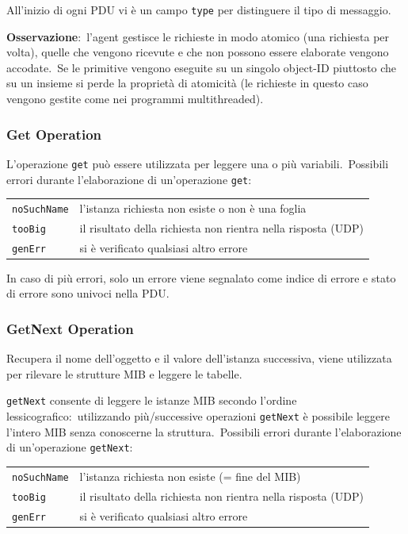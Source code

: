 All'inizio di ogni PDU vi è un campo \texttt{type} per distinguere il tipo di messaggio.\

\textbf{Osservazione}:\ l'agent gestisce le richieste in modo atomico (una richiesta per volta), quelle che vengono ricevute e che non possono essere elaborate vengono accodate.\
Se le primitive vengono eseguite su un singolo object-ID piuttosto che su un insieme si perde la proprietà di atomicità (le richieste in questo caso vengono gestite come nei programmi multithreaded).

\subsubsection{Get Operation}

L'operazione \texttt{get} può essere utilizzata per leggere una o più variabili.\
Possibili errori durante l'elaborazione di un'operazione \texttt{get}:
\begin{table}[H]
    \centering
    \begin{tabular}{l l}
        \texttt{noSuchName} & l'istanza richiesta non esiste o non è una foglia             \\
        \texttt{tooBig}     & il risultato della richiesta non rientra nella risposta (UDP) \\
        \texttt{genErr}     & si è verificato qualsiasi altro errore                        \\
    \end{tabular}
\end{table}

\noindent In caso di più errori, solo un errore viene segnalato come indice di errore e stato di errore sono univoci nella PDU.

\subsubsection{GetNext Operation}

Recupera il nome dell'oggetto e il valore dell'istanza successiva, viene utilizzata per rilevare le strutture MIB e leggere le tabelle.\

\texttt{getNext} consente di leggere le istanze MIB secondo l'ordine lessicografico:\ utilizzando più{\slash}successive operazioni \texttt{getNext} è possibile leggere l'intero MIB senza conoscerne la struttura.\
Possibili errori durante l'elaborazione di un'operazione \texttt{getNext}:

\begin{table}[H]
    \begin{tabular}{l l}
        \texttt{noSuchName} & l'istanza richiesta non esiste (= fine del MIB)               \\
        \texttt{tooBig}     & il risultato della richiesta non rientra nella risposta (UDP) \\
        \texttt{genErr}     & si è verificato qualsiasi altro errore                        \\
    \end{tabular}
\end{table}

